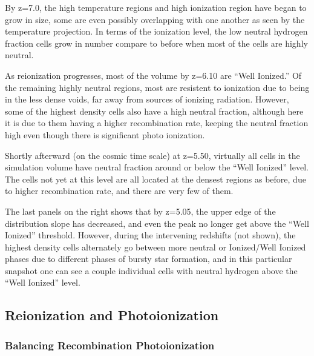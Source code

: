 \documentclass[letterpaper,10pt]{article}
\renewcommand{\(}{\left(}
\renewcommand{\)}{\right)}
\begin{document}
By z=7.0, the high temperature regions and high ionization region have began to grow in size, 
some are even possibly overlapping with one another as seen by the temperature projection.  In terms of the ionization level, the low neutral hydrogen fraction cells grow in number compare to before when most of the cells are highly neutral.

As reionization progresses, most of the volume by z=6.10 are ``Well
Ionized.''  Of the remaining highly neutral regions, most are resistent to ionization
due to being in the less dense voids, far away from sources of ionizing
radiation.  However, some of the highest density cells also have a high
neutral fraction, although here it is due to them having a higher
recombination rate, keeping the neutral fraction high even though
there is significant photo ionization.

Shortly afterward (on the cosmic time scale) at z=5.50, 
virtually all cells in the simulation volume have neutral fraction
around or below the ``Well Ionized'' level.  The cells not yet at
this level are all located at the densest regions as before, due to
higher recombination rate, and there are very few of them.

The last panels on the right shows that by z=5.05, the upper edge
of the distribution slope has decreased, and even the peak no longer
get above the ``Well Ionized'' threshold.  However, during the
intervening redshifts (not shown), the highest density cells
alternately go between more neutral or Ionized/Well Ionized phases due to different
phases of bursty star formation, and in this particular snapshot one can see
a couple individual cells with neutral hydrogen above the ``Well Ionized'' level. 

\subsection{Reionization and Photoionization}
\label{ReionizationPhotoionization}

\subsubsection{Balancing Recombination Photoionization}
\label{BalancingRecombinationPhotoionization}
\end{document}
